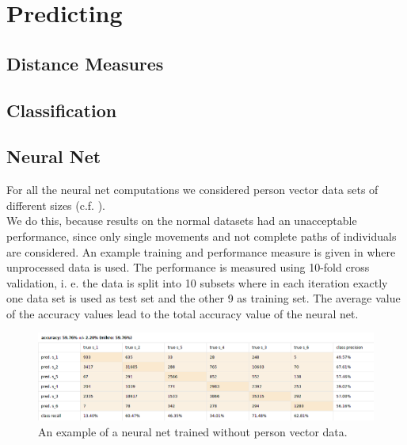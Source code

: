 \documentclass[runningheads]{llncs}
\begin{document}
	\section{Predicting}
	
	\subsection{Distance Measures} \label{subsec: distance measures}
	
	\subsection{Classification} \label{subsec: classification}
	{}

	
	\subsection{Neural Net} \label{subsec: neural net}
	For all the neural net computations we considered person vector data sets of different sizes (c.f. ).\\
	
	We do this, because results on the normal datasets had an unacceptable performance, since only single movements and not complete paths of individuals are considered. An example training and performance measure is given in  where unprocessed data is used. The performance is measured using 10-fold cross validation, i. e. the data is split into 10 subsets where in each iteration exactly one data set is used as test set and the other 9 as training set. The average value of the accuracy values lead
	to the total accuracy value of the neural net.
	\begin{figure}[H]
		\centering
		\includegraphics[scale = 0.4]{src/pic/NN_without_vector.png}
		\caption{An example of a neural net trained without person vector data.}
		\label{fig: NN without vector}
	\end{figure}
	
\end{document}
